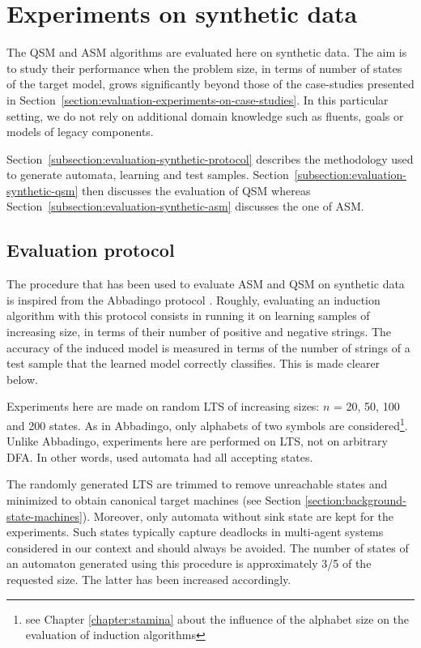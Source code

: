 \section{Experiments on synthetic data\label{section:evaluation-experiments-on-synthetic-data}}

The QSM and ASM algorithms are evaluated here on synthetic data. The aim is to study their performance when the problem size, in terms of number of states of the target model, grows significantly beyond those of the case-studies presented in Section~\ref{section:evaluation-experiments-on-case-studies}. In this particular setting, we do not rely on additional domain knowledge such as fluents, goals or models of legacy components.

Section~\ref{subsection:evaluation-synthetic-protocol} describes the methodology used to generate automata, learning and test samples. Section~\ref{subsection:evaluation-synthetic-qsm} then discusses the evaluation of QSM whereas Section~\ref{subsection:evaluation-synthetic-asm} discusses the one of ASM.  

\subsection{Evaluation protocol\label{subsection:evaluation-synthetic-protocol}}

The procedure that has been used to evaluate ASM and QSM on synthetic data is inspired from the Abbadingo protocol \cite{Lang:1998}. Roughly, evaluating an induction algorithm with this protocol consists in running it on learning samples of increasing size, in terms of their number of positive and negative strings. The accuracy of the induced model is measured in terms of the number of strings of a test sample that the learned model correctly classifies. This is made clearer below.

Experiments here are made on random LTS of increasing sizes: $n$ = 20, 50, 100 and 200 states. As in Abbadingo, only alphabets of two symbols are considered\footnote{see Chapter \ref{chapter:stamina} about the influence of the alphabet size on the evaluation of induction algorithms}. Unlike Abbadingo, experiments here are performed on LTS, not on arbitrary DFA. In other words, used automata had all accepting states.

The randomly generated LTS are trimmed to remove unreachable states and minimized to obtain canonical target machines (see Section \ref{section:background-state-machines}). Moreover, only automata without sink state are kept for the experiments. Such states typically capture deadlocks in multi-agent systems considered in our context and should always be avoided. The number of states of an automaton generated using this procedure is approximately 3/5 of the requested size. The latter has been increased accordingly.

